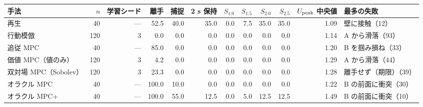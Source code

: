 \begin{tabular}{lrrrrrrrrrrl}
\toprule
手法 & $n$ & 学習シード & 離手 & 捕捉 & 2 s 保持 & $S_{1.0}$ & $S_{1.5}$ & $S_{2.0}$ & $S_{2.5}$ & $U_{\mathrm{peak}}$ 中央値 & 最多の失敗 \\
\midrule
再生 & 40 & --- & 52.5 & 40.0 & 35.0 & 0.0 & 7.5 & 35.0 & 35.0 & 1.09 & 壁に接触（12） \\
行動模倣 & 120 & 3 & 0.0 & 0.0 & 0.0 & 0.0 & 0.0 & 0.0 & 0.0 & 1.14 & A から滑落（93） \\
追従 MPC & 40 & --- & 85.0 & 0.0 & 0.0 & 0.0 & 0.0 & 0.0 & 0.0 & 1.20 & B を掴み損ね（33） \\
価値 MPC（値のみ） & 120 & 3 & 4.2 & 0.0 & 0.0 & 0.0 & 0.0 & 0.0 & 0.0 & 1.29 & A から滑落（44） \\
双対場 MPC（Sobolev） & 120 & 3 & 23.3 & 0.0 & 0.0 & 0.0 & 0.0 & 0.0 & 0.0 & 1.28 & 離手せず（期限）（39） \\
オラクル MPC & 40 & --- & 100.0 & 10.0 & 0.0 & 0.0 & 0.0 & 0.0 & 0.0 & 1.22 & B の前面に衝突（30） \\
オラクル MPC+ & 40 & --- & 100.0 & 55.0 & 12.5 & 0.0 & 5.0 & 12.5 & 12.5 & 1.49 & B の前面に衝突（10） \\
\bottomrule
\end{tabular}
